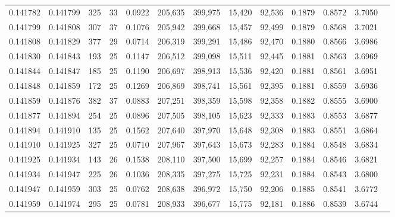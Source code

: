 \begin{tabular}{rrrrrrrrrrrrr}
0.141782 & 0.141799 & 325 &  33 &                                     0.0922 & 205,635 & 399,975 &  15,420 &  92,536 & 0.1879 & 0.8572 & 3.7050 \\
0.141799 & 0.141808 & 307 &  37 &                                     0.1076 & 205,942 & 399,668 &  15,457 &  92,499 & 0.1879 & 0.8568 & 3.7021 \\
0.141808 & 0.141829 & 377 &  29 &                                     0.0714 & 206,319 & 399,291 &  15,486 &  92,470 & 0.1880 & 0.8566 & 3.6986 \\
0.141830 & 0.141843 & 193 &  25 &                                     0.1147 & 206,512 & 399,098 &  15,511 &  92,445 & 0.1881 & 0.8563 & 3.6969 \\
0.141844 & 0.141847 & 185 &  25 &                                     0.1190 & 206,697 & 398,913 &  15,536 &  92,420 & 0.1881 & 0.8561 & 3.6951 \\
0.141848 & 0.141859 & 172 &  25 &                                     0.1269 & 206,869 & 398,741 &  15,561 &  92,395 & 0.1881 & 0.8559 & 3.6936 \\
0.141859 & 0.141876 & 382 &  37 &                                     0.0883 & 207,251 & 398,359 &  15,598 &  92,358 & 0.1882 & 0.8555 & 3.6900 \\
0.141877 & 0.141894 & 254 &  25 &                                     0.0896 & 207,505 & 398,105 &  15,623 &  92,333 & 0.1883 & 0.8553 & 3.6877 \\
0.141894 & 0.141910 & 135 &  25 &                                     0.1562 & 207,640 & 397,970 &  15,648 &  92,308 & 0.1883 & 0.8551 & 3.6864 \\
0.141910 & 0.141925 & 327 &  25 &                                     0.0710 & 207,967 & 397,643 &  15,673 &  92,283 & 0.1884 & 0.8548 & 3.6834 \\
0.141925 & 0.141934 & 143 &  26 &                                     0.1538 & 208,110 & 397,500 &  15,699 &  92,257 & 0.1884 & 0.8546 & 3.6821 \\
0.141934 & 0.141947 & 225 &  26 &                                     0.1036 & 208,335 & 397,275 &  15,725 &  92,231 & 0.1884 & 0.8543 & 3.6800 \\
0.141947 & 0.141959 & 303 &  25 &                                     0.0762 & 208,638 & 396,972 &  15,750 &  92,206 & 0.1885 & 0.8541 & 3.6772 \\
0.141959 & 0.141974 & 295 &  25 &                                     0.0781 & 208,933 & 396,677 &  15,775 &  92,181 & 0.1886 & 0.8539 & 3.6744 \\

\end{tabular}
